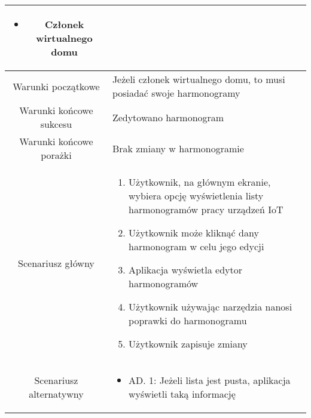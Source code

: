 \documentclass{article}
\begin{document}
\begin{enumerate}
\begin{enumerate}
\begin{table}[H]
\begin{tabular}{|c|p{7cm}|}
\begin{itemize}
\item Członek wirtualnego domu\end{itemize}                                                                                                                                                                                                                                                                     \\
						\hline
						Warunki początkowe      & Jeżeli członek wirtualnego domu, to musi posiadać swoje harmonogramy                                                                                                                                                                                                                                                                                              \\
						\hline
						Warunki końcowe sukcesu & Zedytowano harmonogram                                                                                                                                                                                                                                                                                                                                            \\
						\hline
						Warunki końcowe porażki & Brak zmiany w harmonogramie                                                                                                                                                                                                                                                                                                                                       \\
						\hline
						Scenariusz główny       & \begin{enumerate}\item Użytkownik, na głównym ekranie, wybiera opcję wyświetlenia listy harmonogramów pracy urządzeń IoT

\item Użytkownik może kliknąć dany harmonogram w celu jego edycji

\item Aplikacja wyświetla edytor harmonogramów

\item Użytkownik używając narzędzia nanosi poprawki do harmonogramu

\item Użytkownik zapisuje zmiany\end{enumerate} \\
						\hline
						Scenariusz alternatywny & \begin{itemize}\item AD. 1: Jeżeli lista jest pusta, aplikacja wyświetli taką informację


\end{itemize}
\end{tabular}
\end{table}
\end{enumerate}
\end{enumerate}
\end{document}
